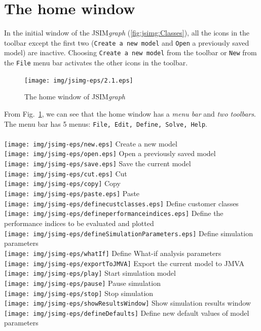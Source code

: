 \section{The home window} In the initial window of the
JSIM\emph{graph} (\autoref{fig:jsimg:Classes}), all the icons in
the toolbar except the first two (\texttt{Create a new model} and
\texttt{Open} a previously saved model) are inactive. Choosing
\texttt{Create a new model} from the toolbar or \texttt{New} from
the \texttt{File} menu bar activates the other icons in the
toolbar.
\begin{figure}[htbp]
    \begin{center}
        \texttt{[image: img/jsimg-eps/2.1.eps]}
    \end{center}
    \caption{The home window of JSIM\emph{graph}}
    \label{fig:jsimg:Classes}
\end{figure}
From Fig.~\ref{fig:jsimg:Classes}, we can see that the home window
has a \emph{menu bar} and \emph{two toolbars}. The menu bar has 5
menus: \texttt{File, Edit, Define,
Solve, Help}.\\

\\
\texttt{[image: img/jsimg-eps/new.eps]} Create a new model\\
\texttt{[image: img/jsimg-eps/open.eps]} Open a previously saved
model\\
\texttt{[image: img/jsimg-eps/save.eps]} Save the current
model\\
\texttt{[image: img/jsimg-eps/cut.eps]} Cut\\
\texttt{[image: img/jsimg-eps/copy]}
Copy\\
\texttt{[image: img/jsimg-eps/paste.eps]} Paste\\
\texttt{[image: img/jsimg-eps/definecustclasses.eps]} Define customer
classes\\
\texttt{[image: img/jsimg-eps/defineperformanceindices.eps]} Define the performance
indices to be evaluated and plotted\\
\texttt{[image: img/jsimg-eps/defineSimulationParameters.eps]} Define simulation
parameters\\
\texttt{[image: img/jsimg-eps/whatIf]} Define What-if analysis
parameters\\
\texttt{[image: img/jsimg-eps/exportToJMVA]} Export the current model to
JMVA\\
\texttt{[image: img/jsimg-eps/play]} Start simulation
model\\
\texttt{[image: img/jsimg-eps/pause]} Pause simulation\\
\texttt{[image: img/jsimg-eps/stop]}
Stop simulation\\
\texttt{[image: img/jsimg-eps/showResultsWindow]} Show simulation results
window\\
\texttt{[image: img/jsimg-eps/defineDefaults]} Define new default values of model
parameters\\

